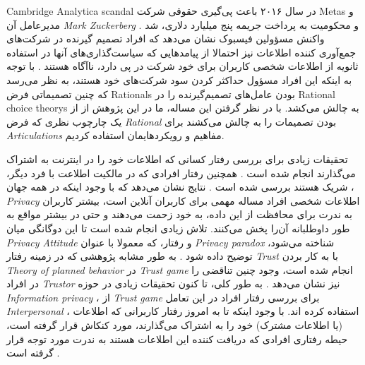 \gls{Cambridge Analytica scandal}
در سال ۲۰۱۶ باعث پی‌گیری‌ حقوقی شرکت 
\glspl{Meta} 
و مدیرعامل آن 
\textit{
  \gls{Mark Zuckerberg}
}
و محکومیت به پرداخت جریمه پنج میلیارد دلاری، شد
.
واکنش مسؤولین فیسبوک نشان می‌دهد
که افراد تصمیم گیرنده در شرکت‌های جمع‌آوری کننده
اطلاعات نیز احتمالا از پیامدهایی که سیاست‌گذاری‌های آنها در استفاده ثانویه از اطلاعات شخصی کاربران
برای خود شرکت در پی دارد، ناآگاه هستند
\!. با توجه به اینکه این افراد مسؤول حداکثر
کردن سود شرکت‌های خود هستند،
به نظر می‌رسد که چنین تصمیماتی فرض
\glspl{Rational}
بودن عامل‌های تصمیم‌گیرنده را در
\glspl{Rational choice theory}
به چالش می‌کشد. با در نظر گرفتن این مساله‌، ما در این پژوهش از از یک چارچوب نظری که فرض
\textit{
  \gls{Rational}
}
بودن تصمیمات را به چالش می‌کشند برای
\textit{
  \glspl{Articulation}
}
مفاهیم و رویکردهایمان استفاده کردیم.


تحقیقات زیادی برای بررسی رفتار کسانی که
اطلاعات خود را در اینترنت به اشتراک می‌گذارند انجام شده است
\!.
همچنین رفتار افرادی که در مالکیت اطلاعت با فرد دیگر، شریک هستند بررسی شده است
\!.
نتایج نشان می‌دهد که با وجود اینکه در همه جهان
\!،
\textit{
  \gls{Privacy}
}
اطلاعات شخصی افراد مساله مهمی برای کاربران آنلاین
است، بیشتر کاربران به ندرت برای محافظت از این داده، به خود زحمت می‌دهند و حتی در
بیشتر مواقع به طور داوطلبانه آن‌را پخش می‌کنند. تلاش زیادی انجام شده است تا این
دوگانگی میان
\textit{
  \gls{Privacy Attitude}
}
و رفتار، که معمولا با عنوان
\textit{
  \gls{Privacy paradox}
}
شناخته می‌شود، توضیح داده شود
\!.
به طور مشابه پژوهشی که در زمینه رفتار
\textit{
  \gls{Trust}
}
با به کار بردن
\textit{
  \gls{Theory of planned behavior}
}
در
\textit{
  \gls{Trust game}
}
انجام شده است،  وجود چنین تناقضی را در افراد
\textit{
  \gls{Trustor}
}
نیز نشان می‌دهد
\!\cite{gazdagNotWantTrust2019}.
به طور کلی، تا کنون  تحقیقات زیادی در حوزه
\textit{
  \gls{Information privacy}
}،
از
\textit{
  \gls{Trust game}
}
برای بررسی رفتار افراد در این تعامل
\textit{
  \gls{Interpersonal}
}،
استفاده کرده اند. با وجود اینکه تا به امروز رفتار کاربرانی که اطلاعات
\!(یا اطلاعات مشترک)
خود را به اشتراک می‌گذارند، مورد کنکاش قرار گرفته است، حیطه
رفتاری افرادی که دریافت کننده این  اطلاعات هستند به ندرت
مورد توجه قرار گرفته است
\!\cite{demmersYourDataAre2021}.

